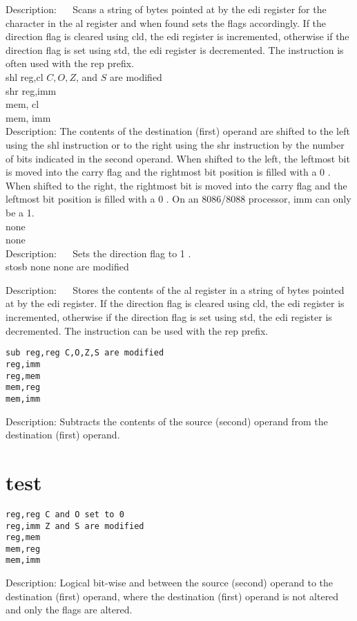 \documentclass[10pt]{article}
\begin{document}
Description: $\quad$ Scans a string of bytes pointed at by the edi register for the character in the al register and when found sets the flags accordingly. If the direction flag is cleared using cld, the edi register is incremented, otherwise if the direction flag is set using std, the edi register is decremented. The instruction is often used with the rep prefix.\\
shl reg,cl $C, O, Z$, and $S$ are modified\\
shr reg,imm\\
mem, cl\\
mem, imm\\
Description: The contents of the destination (first) operand are shifted to the left using the shl instruction or to the right using the shr instruction by the number of bits indicated in the second operand. When shifted to the left, the leftmost bit is moved into the carry flag and the rightmost bit position is filled with a 0 . When shifted to the right, the rightmost bit is moved into the carry flag and the leftmost bit position is filled with a 0 . On an 8086/8088 processor, imm can only be a 1.\\
none\\
none\\
Description: $\quad$ Sets the direction flag to 1 .\\
stosb none none are modified

Description: $\quad$ Stores the contents of the al register in a string of bytes pointed at by the edi register. If the direction flag is cleared using cld, the edi register is incremented, otherwise if the direction flag is set using std, the edi register is decremented. The instruction can be used with the rep prefix.

\begin{verbatim}
sub reg,reg C,O,Z,S are modified
reg,imm
reg,mem
mem,reg
mem,imm
\end{verbatim}

Description: Subtracts the contents of the source (second) operand from the destination (first) operand.

\section*{test}
\begin{verbatim}
reg,reg C and O set to 0
reg,imm Z and S are modified
reg,mem
mem,reg
mem,imm
\end{verbatim}

Description: Logical bit-wise and between the source (second) operand to the destination (first) operand, where the destination (first) operand is not altered and only the flags are altered.
\end{document}
